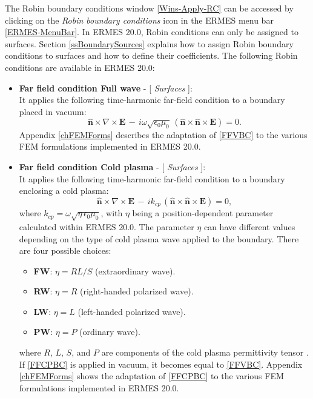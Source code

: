 The Robin boundary conditions window \ref{Wins-Apply-RC} can be accessed by clicking on the \textit{Robin boundary conditions} icon in the ERMES menu bar \ref{ERMES-MenuBar}. In ERMES 20.0, Robin conditions can only be assigned to surfaces. Section \ref{ssBoundarySources} explains how to assign Robin boundary conditions to surfaces and how to define their coefficients. The following Robin conditions are available in ERMES 20.0:
\begin{itemize}\itemsep0em 
	\item \textbf{Far field condition Full wave} - [ \textit{Surfaces} ]:\\ 
	It applies the following time-harmonic far-field condition to a boundary placed in vacuum:
	\begin{equation}\label{FFVBC}
		\mathbf{\hat{n}}\times\nabla\times\mathbf{E}\, - \,i\omega\sqrt{\epsilon_{0}\mu_{0}}\,\left(\mathbf{\hat{n}}\times\mathbf{\hat{n}}\times\mathbf{E}\right) = 0.
	\end{equation}
	Appendix \ref{chFEMForms} describes the adaptation of \eqref{FFVBC} to the various FEM formulations implemented in ERMES 20.0.
    \\
	\item \textbf{Far field condition Cold plasma} - [ \textit{Surfaces} ]:\\ 
	It applies the following time-harmonic far-field condition to a boundary enclosing a cold plasma:
	\begin{equation}\label{FFCPBC}
		\mathbf{\hat{n}}\times\nabla\times\mathbf{E}\, - \,ik_{cp}\,\left(\mathbf{\hat{n}}\times\mathbf{\hat{n}}\times\mathbf{E}\right) = 0,
	\end{equation}
	where $k_{cp} = \omega\sqrt{\eta\,\epsilon_{0}\mu_{0}}$, with $\eta$ being a position-dependent parameter calculated within ERMES 20.0. The parameter $\eta$ can have different values depending on the type of cold plasma wave applied to the boundary. There are four possible choices:
	\begin{itemize}\itemsep0em 
		\item \textbf{FW}: $\eta = RL/S$ (extraordinary wave).
		\item \textbf{RW}: $\eta = R$ (right-handed polarized wave).
		\item \textbf{LW}: $\eta = L$ (left-handed polarized wave).
		\item \textbf{PW}: $\eta = P$ (ordinary wave).
	\end{itemize}
	where $R$, $L$, $S$, and $P$ are components of the cold plasma permittivity tensor \cite{Stix, Swanson}. If \eqref{FFCPBC} is applied in vacuum, it becomes equal to \eqref{FFVBC}. Appendix \ref{chFEMForms} shows the adaptation of \eqref{FFCPBC} to the various FEM formulations implemented in ERMES 20.0.

\end{itemize}
